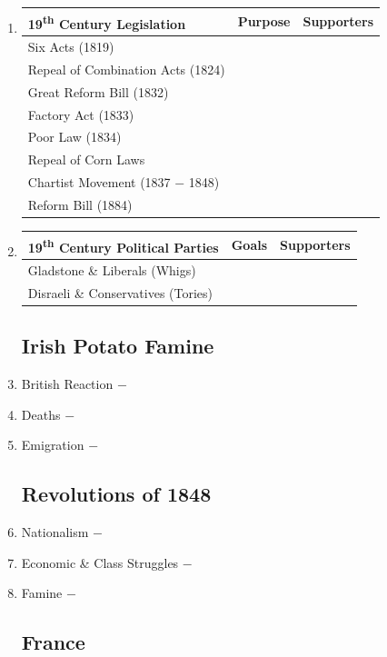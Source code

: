 \documentclass[12pt]{article}
\begin{document}
\begin{enumerate}
\item \begin{tabular}{l c c}

19\textsuperscript{th} Century Legislation & Purpose & Supporters \\
\hline
Six Acts (1819) & & \\
\hline
Repeal of Combination Acts (1824) & & \\
\hline
Great Reform Bill (1832) & & \\
\hline
Factory Act (1833) & & \\
\hline
Poor Law (1834) & & \\
\hline
Repeal of Corn Laws & & \\
\hline
Chartist Movement (1837 $-$ 1848) & & \\
\hline 
Reform Bill (1884) & & \\
\end{tabular}

\item \begin{tabular}{l c c}
\hline
19\textsuperscript{th} Century Political Parties & Goals & Supporters \\
\hline
Gladstone \& Liberals (Whigs) & & \\
\hline
Disraeli \& Conservatives (Tories) & & \\
\hline
\end{tabular}

\subsection{Irish Potato Famine}
\item British Reaction $-$ 

\item Deaths $-$ 

\item Emigration $-$

\subsection{Revolutions of 1848}

\item Nationalism $-$ 

\item Economic \& Class Struggles $-$

\item Famine $-$

\subsection{France}


\end{enumerate}
\end{document}
